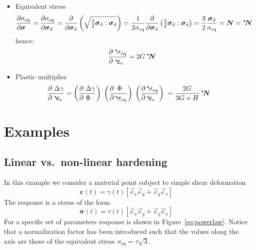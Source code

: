 \documentclass[times,namecite]{goose-article}
\newcommand\leftstar[1]{\hspace*{-.3em}~^\star\!#1}
\begin{document}
\begin{itemize}
%
\item Equivalent stress
\begin{equation}
  \frac{\partial \sigma_\mathrm{eq} \hfill}{\partial \bm{\sigma} \hfill}
  = \frac{\partial \sigma_\mathrm{eq} \hfill}{\partial \bm{\sigma}_\mathrm{d} \hfill}
  = \frac{\partial}{\partial \bm{\sigma}_\mathrm{d} } \left( \sqrt{ \tfrac{3}{2} \bm{\sigma}_\mathrm{d} : \bm{\sigma}_\mathrm{d} } \right)
  = \frac{1}{2 \sigma_\mathrm{eq} } \frac{\partial}{\partial \bm{\sigma}_\mathrm{d}} \left( \tfrac{3}{2} \bm{\sigma}_\mathrm{d} : \bm{\sigma}_\mathrm{d} \right)
  = \frac{3}{2} \frac{\bm{\sigma}_\mathrm{d}}{\sigma_\mathrm{eq}} = \bm{N} = \leftstar{\bm{N}}
\end{equation}
hence:
\begin{equation}
  \frac{
    \partial \;\leftstar{\sigma}_\mathrm{eq} \hfill
  }{
    \partial \;\leftstar{\bm{\varepsilon}}_\mathrm{e} \hfill
  } =
  2 G \, \leftstar{\bm{N}}
\end{equation}
%
\item Plastic multiplier
\begin{align}
  \frac{
    \partial ~\Delta \gamma \hfill
  }{
    \partial \;\leftstar{\bm{\varepsilon}}_\mathrm{e}  \hfill
  }
  =
  \left( \frac{
    \partial ~\Delta \gamma \hfill
  }{
    \partial ~\Phi \hfill
  } \right) \;
  \left( \frac{
    \partial \,~\Phi \hfill
  }{
    \partial \,\leftstar{\sigma}_\mathrm{eq} \hfill
  } \right) \;
  \left( \frac{
    \partial \,\leftstar{\sigma}_\mathrm{eq} \hfill
  }{
    \partial \,\leftstar{\bm{\varepsilon}}_\mathrm{e} \hfill
  } \right) \;
  &= \frac{2 G}{3 G + H} \, \leftstar{\bm{N}}
\end{align}
%
\end{itemize}

\vfill\newpage
\section{Examples}

\subsection{Linear vs.\ non-linear hardening}

In this example we consider a material point subject to simple shear deformation
\begin{equation}
  \bm{\varepsilon}(t) = \gamma(t) \left[ \vec{e}_x \vec{e}_y + \vec{e}_y \vec{e}_x \right]
\end{equation}
The response is a stress of the form
\begin{equation}
  \bm{\sigma}(t) = \tau(t) \left[ \vec{e}_x \vec{e}_y + \vec{e}_y \vec{e}_x \right]
\end{equation}
For a specific set of parameters response is shown in Figure~\ref{eq:powerlaw}. Notice that a  normalization factor has been introduced such that the values along the axis are those of the equivalent stress $\sigma_\mathrm{eq} = \tau \sqrt{3}$.
\end{document}
